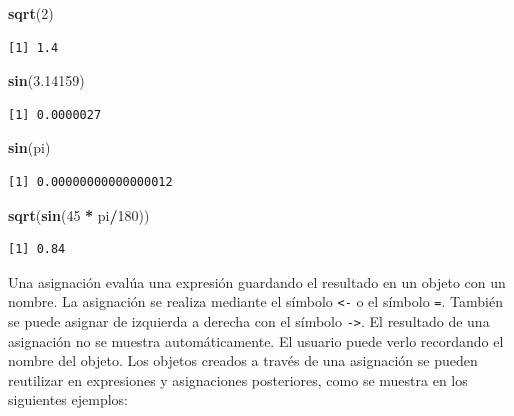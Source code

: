\documentclass[
]{article}
\newenvironment{Shaded}{\begin{snugshade}}{\end{snugshade}}
\newcommand{\DecValTok}[1]{\textcolor[rgb]{0.00,0.00,0.81}{#1}}
\newcommand{\FloatTok}[1]{\textcolor[rgb]{0.00,0.00,0.81}{#1}}
\newcommand{\FunctionTok}[1]{\textcolor[rgb]{0.13,0.29,0.53}{\textbf{#1}}}
\newcommand{\NormalTok}[1]{#1}
\newcommand{\SpecialCharTok}[1]{\textcolor[rgb]{0.81,0.36,0.00}{\textbf{#1}}}
\begin{document}
\begin{Shaded}
\begin{Highlighting}[]
\FunctionTok{sqrt}\NormalTok{(}\DecValTok{2}\NormalTok{)}
\end{Highlighting}
\end{Shaded}

\begin{verbatim}
[1] 1.4
\end{verbatim}

\begin{Shaded}
\begin{Highlighting}[]
\FunctionTok{sin}\NormalTok{(}\FloatTok{3.14159}\NormalTok{)}
\end{Highlighting}
\end{Shaded}

\begin{verbatim}
[1] 0.0000027
\end{verbatim}

\begin{Shaded}
\begin{Highlighting}[]
\FunctionTok{sin}\NormalTok{(pi)}
\end{Highlighting}
\end{Shaded}

\begin{verbatim}
[1] 0.00000000000000012
\end{verbatim}

\begin{Shaded}
\begin{Highlighting}[]
\FunctionTok{sqrt}\NormalTok{(}\FunctionTok{sin}\NormalTok{(}\DecValTok{45} \SpecialCharTok{*}\NormalTok{ pi}\SpecialCharTok{/}\DecValTok{180}\NormalTok{))}
\end{Highlighting}
\end{Shaded}

\begin{verbatim}
[1] 0.84
\end{verbatim}

Una asignación evalúa una expresión guardando el resultado en un objeto con un nombre. La asignación se realiza mediante el símbolo \texttt{\textless{}-} o el símbolo \texttt{=}. También se puede asignar de izquierda a derecha con el símbolo \texttt{-\textgreater{}}. El resultado de una asignación no se muestra automáticamente. El usuario puede verlo recordando el nombre del objeto. Los objetos creados a través de una asignación se pueden reutilizar en expresiones y asignaciones posteriores, como se muestra en los siguientes ejemplos:
\end{document}
